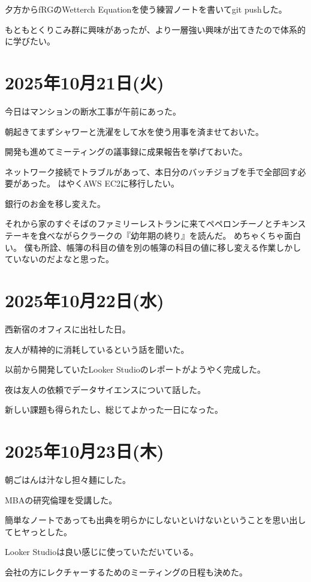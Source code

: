 \documentclass[uplatex]{jsarticle}
\begin{document}
夕方からfRGのWetterch Equationを使う練習ノートを書いてgit pushした。

もともとくりこみ群に興味があったが、より一層強い興味が出てきたので体系的に学びたい。

\section{2025年10月21日(火)}

今日はマンションの断水工事が午前にあった。

朝起きてまずシャワーと洗濯をして水を使う用事を済ませておいた。

開発も進めてミーティングの議事録に成果報告を挙げておいた。

ネットワーク接続でトラブルがあって、本日分のバッチジョブを手で全部回す必要があった。
はやくAWS EC2に移行したい。

銀行のお金を移し変えた。

それから家のすぐそばのファミリーレストランに来てペペロンチーノとチキンステーキを食べながらクラークの『幼年期の終り』を読んだ。
めちゃくちゃ面白い。
僕も所詮、帳簿の科目の値を別の帳簿の科目の値に移し変える作業しかしていないのだよなと思った。

\section{2025年10月22日(水)} 

西新宿のオフィスに出社した日。

友人が精神的に消耗しているという話を聞いた。

以前から開発していたLooker Studioのレポートがようやく完成した。

夜は友人の依頼でデータサイエンスについて話した。

新しい課題も得られたし、総じてよかった一日になった。

\section{2025年10月23日(木)} 

朝ごはんは汁なし担々麺にした。

MBAの研究倫理を受講した。

簡単なノートであっても出典を明らかにしないといけないということを思い出してヒヤっとした。

Looker Studioは良い感じに使っていただいている。

会社の方にレクチャーするためのミーティングの日程も決めた。
\end{document}
